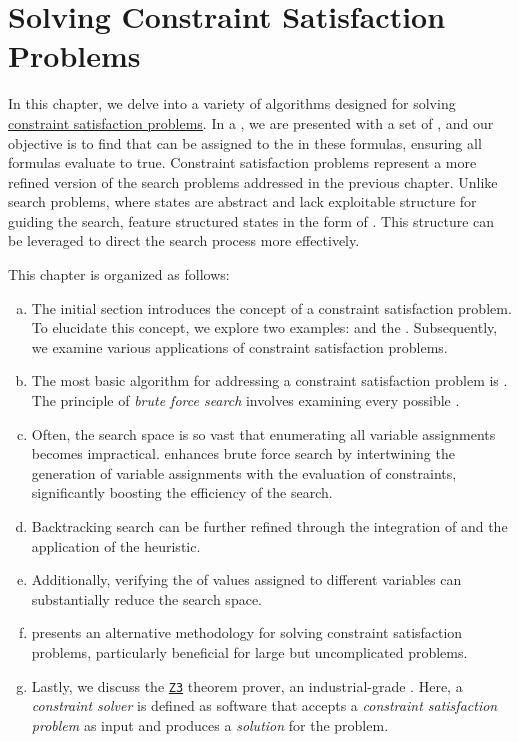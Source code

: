 \chapter{Solving Constraint Satisfaction Problems}
In this chapter, we delve into a variety of algorithms designed for solving 
\href{https://en.wikipedia.org/wiki/Constraint_satisfaction_problem}{constraint satisfaction problems}.
In a , we are presented with a set of , and our objective
is to find  that can be assigned to the  in these formulas, ensuring all formulas
evaluate to true. Constraint satisfaction problems represent a more refined version of the search problems
addressed in the previous chapter. Unlike search problems, where states are abstract and lack exploitable
structure for guiding the search,  feature structured states in the form
of .  This structure can be leveraged to direct the search process more effectively.

This chapter is organized as follows:
\begin{enumerate}[(a)]
\item The initial section introduces the concept of a constraint satisfaction problem. To elucidate this
  concept, we explore two examples:  and the . Subsequently, we
  examine various applications of constraint satisfaction problems. 
\item The most basic algorithm for addressing a constraint satisfaction problem is . The principle of \emph{brute force search} involves examining every possible . 
\item Often, the search space is so vast that enumerating all variable assignments becomes
  impractical.  enhances brute force search by intertwining the generation of
  variable assignments with the evaluation of constraints, significantly boosting the efficiency of the
  search. 
\item Backtracking search can be further refined through the integration of  and
  the application of the  heuristic. 
\item Additionally, verifying the  of values assigned to different variables can
  substantially reduce the search space. 
\item {} presents an alternative methodology for solving constraint satisfaction problems, particularly beneficial for large but uncomplicated problems.
\item Lastly, we discuss the \href{https://microsoft.github.io/z3guide/}{\texttt{Z3}} theorem prover, an industrial-grade . Here, a \emph{constraint solver} is defined as software that accepts a \emph{constraint satisfaction problem} as input and produces a \emph{solution} for the problem.
\end{enumerate}

